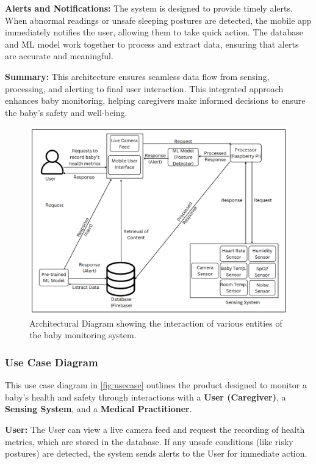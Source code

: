 \documentclass[conference]{IEEEtran}
\begin{document}
\textbf{Alerts and Notifications:} The system is designed to provide timely alerts. When abnormal readings or unsafe sleeping postures are detected, the mobile app immediately notifies the user, allowing them to take quick action. The database and ML model work together to process and extract data, ensuring that alerts are accurate and meaningful.

\textbf{Summary:} This architecture ensures seamless data flow from sensing, processing, and alerting to final user interaction. This integrated approach enhances baby monitoring, helping caregivers make informed decisions to ensure the baby's safety and well-being.


\begin{figure}[hbtp]
  \centering
  \includegraphics[scale=0.3]{./pic/finarch.png}
  \caption{Architectural Diagram showing the interaction of various entities of the baby monitoring system.}
  \label{fig:architecture}
\end{figure}
\subsubsection{Use Case Diagram}

This use case diagram in \ref{fig:usecase} outlines the product designed to monitor a baby’s health and safety through interactions with a \textbf{User (Caregiver)}, a \textbf{Sensing System}, and a \textbf{Medical Practitioner}.

\textbf{User:} The User can view a live camera feed and request the recording of health metrics, which are stored in the database. If any unsafe conditions (like risky postures) are detected, the system sends alerts to the User for immediate action.
    
\end{document}
